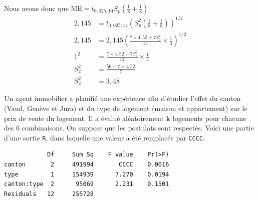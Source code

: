 \begin{questions}
\begin{solution}
    Nous avons donc que ME$=t_{0,025;14}S_p(\frac{1}{8}+\frac{1}{8})$
    \begin{align*}
        2,145&=t_{0,025;14}\left(S_p^2\left(\frac{1}{8}+\frac{1}{8}\right)\right)^{1/2}\\
        2,145&=2,145 \left(\frac{7\times4,52+7 S_2^2}{14} \times \frac{1}{4}\right)^{1/2}\\
        1^2 &= \frac{7\times4,52+7 S_2^2}{14} \times \frac{1}{4}\\
        S_2^2&=\frac{56-7\times 4,52}{7}\\
        S_2^2&=3,48
    \end{align*}
\end{solution}
\newpage 
\question Un agent immobilier a planifié une expérience afin d'étudier l'effet du canton (Vaud, Genève et Jura) et du type de logement (maison et appartement) sur le prix de vente du logement. Il a évalué aléatoirement $\boldsymbol{k}$ logements pour chacune des 6 combinaisons. On suppose que les postulats sont respectés. Voici une partie d'une sortie \texttt{R}, dans laquelle une valeur a été remplacée par \texttt{CCCC}:
\begin{verbatim}
            Df     Sum Sq    F value    Pr(>F)   
canton       2     491994       CCCC    0.0016 
type         1     154939      7.270    0.0194  
canton:type  2      95069      2.231    0.1501   
Residuals   12     255728  
\end{verbatim}

\end{questions}
